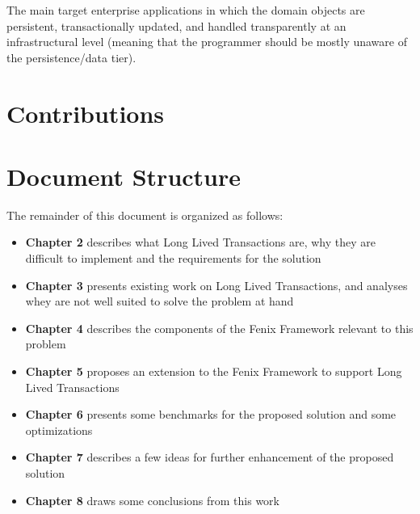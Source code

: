 The main target enterprise applications in
which the domain objects are persistent, transactionally updated, and
handled transparently at an infrastructural level (meaning that the
programmer should be mostly unaware of the persistence/data tier).

\section{Contributions}


\section{Document Structure}

The remainder of this document is organized as follows:

\begin{itemize}

\item {\bf Chapter 2} describes what Long Lived Transactions are, why
  they are difficult to implement and the requirements for the solution

\item {\bf Chapter 3} presents existing work on Long Lived
  Transactions, and analyses whey are not well suited to solve the
  problem at hand

\item {\bf Chapter 4} describes the components of the Fenix Framework
  relevant to this problem

\item {\bf Chapter 5} proposes an extension to the Fenix Framework to
  support Long Lived Transactions

\item {\bf Chapter 6} presents some benchmarks for the proposed
  solution and some optimizations

\item {\bf Chapter 7} describes a few ideas for further enhancement of
  the proposed solution

\item {\bf Chapter 8} draws some conclusions from this work

\end{itemize}